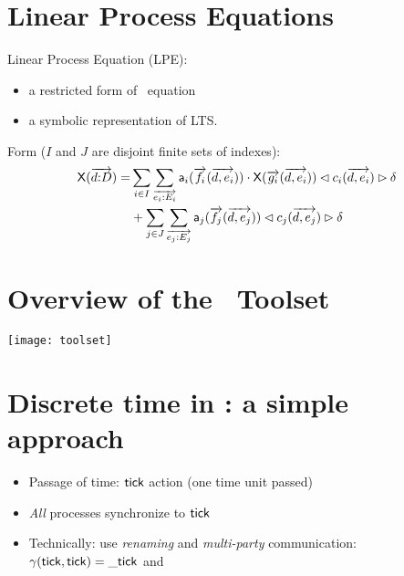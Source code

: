 \begin{slide}
\newslide\section*{Linear Process Equations}
Linear Process Equation (LPE):
\begin{itemize}
\item a restricted form of \mcrl\ equation
\item a symbolic representation of LTS.
\end{itemize}
\pause
Form ($I$ and $J$ are disjoint finite sets of indexes):
\begin{gather*}
\begin{split}
\mathsf{X}(\overrightarrow{d{:} D})=&\sum_{i\in I}\sum_{\overrightarrow{e_i{:} E_i}} \mathsf{a}_i(\overrightarrow{f_i}(\overrightarrow{d,e_i}))\mathbin{\cdot}
\mathsf{X}(\overrightarrow{g_i}(\overrightarrow{d,e_i}))\lhd c_i(\overrightarrow{d,e_i})\rhd\delta\\
&+\sum_{j\in J}\sum_{\overrightarrow{e_j{:} E_j}} \mathsf{a}_j(\overrightarrow{f_j}(\overrightarrow{d,e_j}))\lhd c_j(\overrightarrow{d,e_j})\rhd\delta
\end{split}
\end{gather*}
\newslide\section*{Overview of the \mcrl\ Toolset}
\begin{center}
\texttt{[image: toolset]}
\end{center}
\newslide\section*{Discrete time in \mcrl: a simple approach}
\begin{itemize}
\item Passage of time: $\mathsf{tick}$ action (one time unit passed)
\item \emph{All} processes synchronize to $\mathsf{tick}$
\pause
\item Technically: use \emph{renaming} and \emph{multi-party} communication:
$\gamma(\mathsf{tick},\mathsf{tick})=\mathsf{\_tick}$ and
\end{itemize}
\vspace{-2ex}
\begin{gather*}

\end{gather*}
\end{slide}
